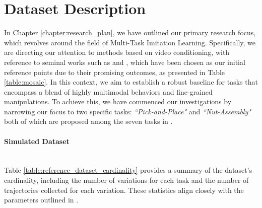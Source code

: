 \section{Dataset Description}
\label{sec:dataset_description}
In Chapter \ref{chapter:research_plan}, we have outlined our primary research focus, which revolves around the field of Multi-Task Imitation Learning. Specifically, we are directing our attention to methods based on video conditioning, with reference to seminal works such as \cite{mandi2022towards_more_generalizable_one_shot} and \cite{dasari2021transformers_one_shot}, which have been chosen as our initial reference points due to their promising outcomes, as presented in Table \ref{table:mosaic}.
In this context, we aim to establish a robust baseline for tasks that encompass a blend of highly multimodal behaviors and fine-grained manipulations. To achieve this, we have commenced our investigations by narrowing our focus to two specific tasks: \textit{``Pick-and-Place"} and \textit{``Nut-Assembly"} both of which are proposed among the seven tasks in \cite{mandi2022towards_more_generalizable_one_shot}.
\paragraph{Simulated Dataset} \mbox{} \\
Table \ref{table:reference_dataset_cardinality} provides a summary of the dataset's cardinality, including the number of variations for each task and the number of trajectories collected for each variation. These statistics align closely with the parameters outlined in \cite{mandi2022towards_more_generalizable_one_shot}.


